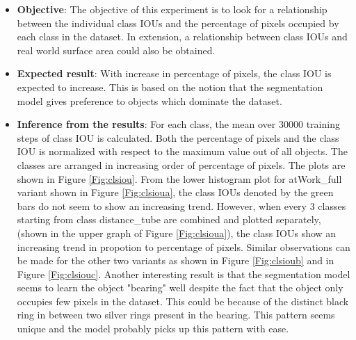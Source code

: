 		\begin{itemize}
			\item \textbf{Objective}: The objective of this experiment is to look for a relationship between the individual class IOUs and the percentage of pixels occupied by each class in the dataset. In extension, a relationship between class IOUs and real world surface area could also be obtained.
			\item \textbf{Expected result}: With increase in percentage of pixels, the class IOU is expected to increase. This is based on the notion that the segmentation model gives preference to objects which dominate the dataset. 
			\item \textbf{Inference from the results}: For each class, the mean over 30000 training steps of class IOU is calculated. Both the percentage of pixels and the class IOU is normalized with respect to the maximum value out of all objects. The classes are arranged in increasing order of percentage of pixels. The plots are shown in Figure \ref{Fig:clsiou}. From the lower histogram plot for atWork\_full variant shown in Figure \ref{Fig:clsioua}, the class IOUs denoted by the green bars do not seem to show an increasing trend. However, when every 3 classes starting from class distance\_tube are combined and plotted separately, (shown in the upper graph of Figure \ref{Fig:clsioua}), the class IOUs show an increasing trend in propotion to percentage of pixels. Similar observations can be made for the other two variants as shown in Figure \ref{Fig:clsioub} and in Figure \ref{Fig:clsiouc}. 
			Another interesting result is that the segmentation model seems to learn the object "bearing" well despite the fact that the object only occupies few pixels in the dataset. This could be because of the distinct black ring in between two silver rings present in the bearing. This pattern seems unique and the model probably picks up this pattern with ease.
		\end{itemize}
	
